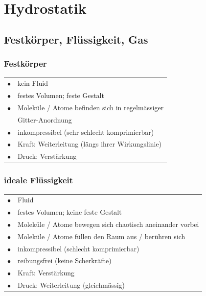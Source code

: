 \section{Hydrostatik}

\subsection{Festkörper, Flüssigkeit, Gas}

\subsubsection{Festkörper}

\begin{tabular}{ll}
	$\bullet$ & kein Fluid \\
	$\bullet$ & festes Volumen; feste Gestalt \\
	$\bullet$ & Moleküle / Atome befinden sich in regelmässiger \\
			  & Gitter-Anordnung \\
	$\bullet$ & inkompressibel (sehr schlecht komprimierbar) \\
	$\bullet$ & Kraft: Weiterleitung (längs ihrer Wirkungslinie) \\
	$\bullet$ & Druck: Verstärkung \\
\end{tabular}

\subsubsection{ideale Flüssigkeit}

\begin{tabular}{ll}
	$\bullet$ & Fluid \\
	$\bullet$ & festes Volumen; keine feste Gestalt \\
	$\bullet$ & Moleküle / Atome bewegen sich chaotisch aneinander vorbei \\
	$\bullet$ & Moleküle / Atome füllen den Raum aus / berühren sich \\
	$\bullet$ & inkompressibel (schlecht komprimierbar) \\
	$\bullet$ & reibungsfrei (keine Scherkräfte)\\
	$\bullet$ & Kraft: Verstärkung \\
	$\bullet$ & Druck: Weiterleitung (gleichmässig) \\
\end{tabular}



